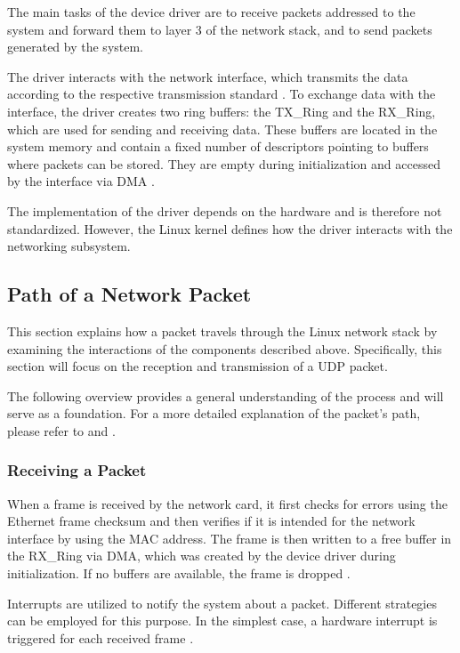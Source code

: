 The main tasks of the device driver are to receive packets addressed to the system and forward them to layer 3 of the network stack, and to send packets generated by the system.

The driver interacts with the network interface, which transmits the data according to the respective transmission standard \cite{lins01}. To exchange data with the interface, the driver creates two ring buffers: the TX\_Ring and the RX\_Ring, which are used for sending and receiving data. These buffers are located in the system memory and contain a fixed number of descriptors pointing to buffers where packets can be stored. They are empty during initialization and accessed by the interface via DMA \cite{lins03, lins14}.

The implementation of the driver depends on the hardware and is therefore not standardized. However, the Linux kernel defines how the driver interacts with the networking subsystem.

\subsection{Path of a Network Packet} \label{chap:sedrecpath}
This section explains how a packet travels through the Linux network stack by examining the interactions of the components described above. Specifically, this section will focus on the reception and transmission of a UDP packet.

The following overview provides a general understanding of the process and will serve as a foundation. For a more detailed explanation of the packet's path, please refer to \cite{lins01} and \cite{lins06}.

\subsubsection{Receiving a Packet} \label{chap:recpath}
When a frame is received by the network card, it first checks for errors using the Ethernet frame checksum and then verifies if it is intended for the network interface by using the MAC address. The frame is then written to a free buffer in the RX\_Ring via DMA, which was created by the device driver during initialization. If no buffers are available, the frame is dropped \cite{lins03, lins06, lins14}.

Interrupts are utilized to notify the system about a packet. Different strategies can be employed for this purpose. In the simplest case, a hardware interrupt is triggered for each received frame \cite{lins06}.

